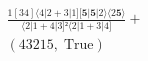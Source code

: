 \documentclass[varwidth, border=5pt]{standalone}
\begin{document}
\begin{my}
$\begin{gathered}
\scriptscriptstyle\frac{1[34]⟨4|2+3|1][𝟓|𝟓|2⟩⟨2𝟓⟩}{⟨2|1+4|3]²⟨2|1+3|4]} +\\
\scriptscriptstyle(43215,\;\text{True}) \phantom{+}
\end{gathered}$
\end{my}
\end{document}
